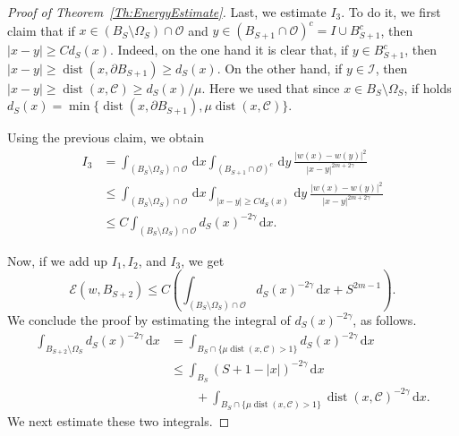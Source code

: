 \documentclass[12pt,reqno]{amsart}
\theoremstyle{definition}
\theoremstyle{remark}
\newcommand{\ccal}{\mathscr{C}}
\newcommand{\ecal}{\mathcal{E}}
\newcommand{\ical}{\mathcal{I}}
\newcommand{\ocal}{\mathcal{O}}
\newcommand{\s}{\gamma}
\renewcommand{\d}{\,\mathrm{d}} %
\DeclareMathOperator{\dist}{dist}
\numberwithin{equation}{section}
\begin{document}
\begin{proof}[Proof of Theorem~\ref{Th:EnergyEstimate}]
	Last, we estimate $I_3$. To do it, we first claim that if $x\in (B_S\setminus \Omega_S) \cap \ocal$ and $y\in (B_{S+1}\cap \ocal)^c = I \cup B_{S+1}^c$, then $|x-y|\geq C d_S(x)$. Indeed, on the one hand it is clear that, if $y\in B_{S+1}^c$, then $|x-y|\geq \dist(x,\partial B_{S+1})\geq d_S(x)$. On the other hand, if $y\in \ical$, then $|x-y|\geq \dist(x,\ccal) \geq  d_S(x) / \mu$. Here we used that since $x\in B_S\setminus \Omega_S $, if holds $d_S(x)=\min \{\dist(x,\partial B_{S+1}), \mu \dist (x, \ccal)\}$. 
	
	Using the previous claim, we obtain
	\begin{align*}
	I_3 &= \int_{(B_S\setminus \Omega_S)\cap \ocal} \d x \int_{(B_{S+1}\cap \ocal)^c} \d y \  \frac{|w(x)-w(y)|^2}{|x-y|^{2m+2\s}} \\
	&\leq \int_{(B_S\setminus \Omega_S)\cap \ocal} \d x \int_{|x-y|\geq C d_S(x)} \d y \ \frac{|w(x)-w(y)|^2}{|x-y|^{2m+2\s}} \\
	&\leq C \int_{(B_S\setminus \Omega_S)\cap \ocal}  d_S(x)^{-2\s} \d x .
	\end{align*}
	
	Now, if we add up $I_1, I_2$, and $I_3$, we get
	\begin{equation}
	\label{Eq:EnergyEstimateProofLastEstimate}
	\ecal(w,B_{S+2}) \leq C \left( \int_{(B_S\setminus \Omega_S)\cap \ocal}  d_S(x)^{-2\s} \d x + S^{2m-1}\right).
	\end{equation}
	We conclude the proof by estimating the integral of $d_S(x)^{-2\s}$, as follows.
	\begin{align*}
	\int_{B_{S+2}\setminus \Omega_S} d_S(x)^{-2\s} \d x &= \int_{B_{S}\cap \{\mu \dist(x,\ccal)>1\}} d_S(x)^{-2\s} \d x \\
	& \leq \int_{B_S} \left( S+1-|x| \right)^{-2\s} \d x \\
	& \quad \quad + \int_{B_{S}\cap \{\mu \dist(x,\ccal)>1\}} \dist(x,\ccal)^{-2\s} \d x.
	\end{align*}
	We next estimate these two integrals.
	

\end{proof}
\end{document}
